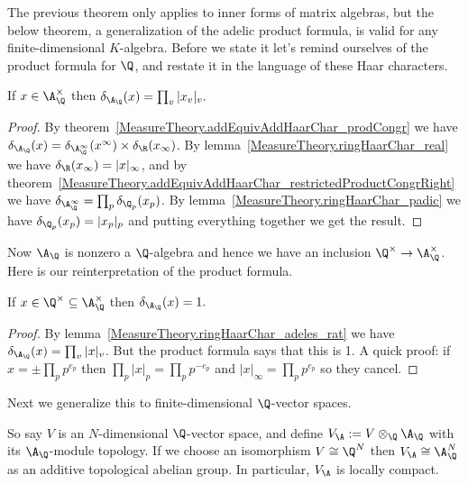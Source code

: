 The previous theorem only applies to inner forms of matrix algebras, but the below theorem,
a generalization of the adelic product formula, is valid for any finite-dimensional
$K$-algebra. Before we state it let's remind ourselves of the product formula for $\Q$,
and restate it in the language of these Haar characters.

\begin{lemma}
  \label{MeasureTheory.ringHaarChar_adeles_rat}
  \leanok
  If $x\in\A_{\Q}^\times$ then $\delta_{\A_{\Q}}(x)=\prod_v|x_v|_v.$
\end{lemma}
\begin{proof}
  By theorem~\ref{MeasureTheory.addEquivAddHaarChar_prodCongr}
  we have $\delta_{\A_{\Q}}(x)=\delta_{\A_{\Q}^\infty}(x^\infty)\times\delta_{\R}(x_\infty)$.
  By lemma~\ref{MeasureTheory.ringHaarChar_real} we have $\delta_{\R}(x_\infty)=|x|_\infty$, and by
  theorem~\ref{MeasureTheory.addEquivAddHaarChar_restrictedProductCongrRight} we have
  $\delta_{\A_{\Q}^\infty}=\prod_p\delta_{\Q_p}(x_p)$. By lemma~\ref{MeasureTheory.ringHaarChar_padic}
  we have $\delta_{\Q_p}(x_p)=|x_p|_p$ and putting everything together we get the result.
\end{proof}

Now $\A_{\Q}$ is nonzero a $\Q$-algebra and hence we have an inclusion $\Q^\times\to\A_{\Q}^\times$.
Here is our reinterpretation of the product formula.

\begin{lemma}
  \label{MeasureTheory.ringHaarChar_adeles_units_rat_eq_one}
  \leanok
  If $x\in\Q^\times\subseteq\A_{\Q}^\times$ then $\delta_{\A_{\Q}}(x)=1.$
\end{lemma}
\begin{proof}
  By lemma~\ref{MeasureTheory.ringHaarChar_adeles_rat} we have $\delta_{\A_{\Q}}(x)=\prod_v|x|_v$.
  But the product formula says that this is 1.
  A quick proof: if $x=\pm\prod_pp^{e_p}$ then $\prod_p|x|_p=\prod_pp^{-e_p}$
  and $|x|_\infty=\prod_pp^{e_p}$ so they cancel.
\end{proof}

  Next we generalize this to finite-dimensional $\Q$-vector spaces.

  So say $V$ is an $N$-dimensional $\Q$-vector space,
  and define $V_{\A}:= V\otimes_{\Q}\A_{\Q}$ with its $\A_{\Q}$-module topology.
  If we choose an isomorphism $V\cong\Q^N$ then $V_{\A}\cong\A_{\Q}^N$
  as an additive topological abelian group. In particular, $V_{\A}$ is locally compact.

